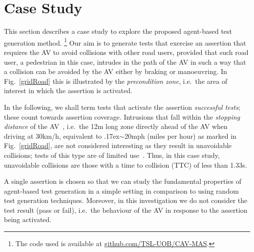 \documentclass[letterpaper, 10 pt, journal, twoside]{IEEEtran}
\begin{document}
\section{Case Study} \label{s:case-study}
 
This section describes a case study to explore the proposed agent-based test generation method.%
\footnote{The code used is available at \url{github.com/TSL-UOB/CAV-MAS}.} %
%
Our aim is to generate tests that exercise an assertion that requires the AV to avoid collisions with other road users, provided that such road user, a pedestrian in this case, intrudes in the path of the AV in such a way that a collision can be avoided by the AV either by braking or manoeuvring. In Fig.~\ref{gridRoad} this is illustrated by the \textit{precondition zone}, i.e.\ the area of interest in which the assertion is activated.

In the following, we shall term tests that activate the assertion \textit{successful tests}; these count towards assertion coverage. 
%
Intrusions that fall within the \textit{stopping distance} of the AV~\cite{codes2015highway}, i.e.\ the 12m long zone 
directly ahead of the AV when driving at 30km/h, equivalent to {\raise.17ex\hbox{$\scriptstyle\sim$}}20mph (miles per hour) as marked in Fig.~\ref{gridRoad}, are not considered interesting as they result in unavoidable collisions; tests of this type are of limited use~\cite{Tuncali2018}. 
%
Thus, in this case study, unavoidable collisions are those with a time to collision (TTC) of less than 1.33s. %
%

A single assertion is chosen so that we can study the fundamental properties of agent-based test generation in a simple setting in comparison to using random test generation techniques.
%
Moreover, in this investigation we do not consider the test result (pass or fail), i.e.\ the behaviour of the AV in response to the assertion being activated. 


\end{document}
